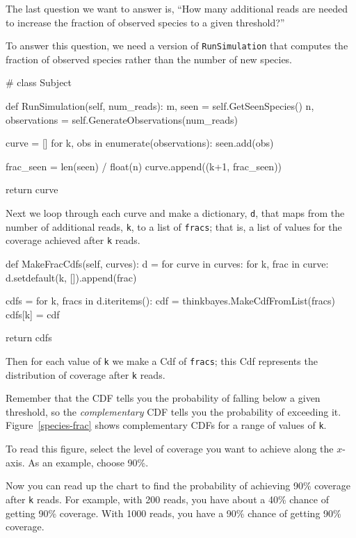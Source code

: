 \documentclass[12pt]{book}
\theoremstyle{exercise}
\begin{document}
The last question we want to answer is, ``How many additional reads
are needed to increase the fraction of observed species to a given
threshold?''

To answer this question, we need a version of {\tt RunSimulation}
that computes the fraction of observed species rather than the
number of new species.

\begin{code}
# class Subject

    def RunSimulation(self, num_reads):
        m, seen = self.GetSeenSpecies()
        n, observations = self.GenerateObservations(num_reads)

        curve = []
        for k, obs in enumerate(observations):
            seen.add(obs)

            frac_seen = len(seen) / float(n)
            curve.append((k+1, frac_seen))

        return curve
\end{code}

Next we loop through each curve and make a dictionary, {\tt d},
that maps from the number of additional reads, {\tt k}, to
a list of {\tt fracs}; that is, a list of values for the
coverage achieved after {\tt k} reads.

\begin{code}
    def MakeFracCdfs(self, curves):
        d = {}
        for curve in curves:
            for k, frac in curve:
                d.setdefault(k, []).append(frac)

        cdfs = {}
        for k, fracs in d.iteritems():
            cdf = thinkbayes.MakeCdfFromList(fracs)
            cdfs[k] = cdf

        return cdfs
\end{code}

Then for each value of {\tt k} we make a Cdf of {\tt fracs}; this Cdf
represents the distribution of coverage after {\tt k} reads.

Remember that the CDF tells you the probability of falling below a
given threshold, so the {\em complementary} CDF tells you the
probability of exceeding it.  Figure~\ref{species-frac} shows
complementary CDFs for a range of values of {\tt k}.

To read this figure, select the level of coverage you want to achieve
along the $x$-axis.  As an example, choose 90\%.

Now you can read up the chart to find the probability of achieving
90\% coverage after {\tt k} reads.  For example, with 200 reads,
you have about a 40\% chance of getting 90\% coverage.  With 1000 reads, you
have a 90\% chance of getting 90\% coverage.
\end{document}
